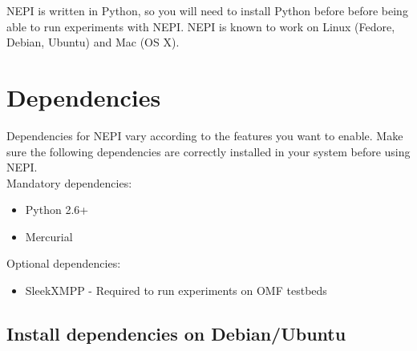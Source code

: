 %
%
%
%
%
%

NEPI is written in Python, so you will need to install Python before
before being able to run experiments with NEPI. 
NEPI is known to work on Linux (Fedore, Debian, Ubuntu) and Mac (OS X).

\section{Dependencies}

Dependencies for NEPI vary according to the features you want to enable.
Make sure the following dependencies are correctly installed in your system
before using NEPI. \\

Mandatory dependencies:
\begin{itemize}
    \item Python 2.6+
    \item Mercurial 
\end{itemize}

Optional dependencies:
\begin{itemize}
    \item SleekXMPP - Required to run experiments on OMF testbeds
\end{itemize}

\subsection{Install dependencies on Debian/Ubuntu}

\begingroup
    \fontsize{10pt}{12pt}\selectfont

